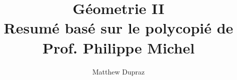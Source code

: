 \documentclass[french]{article}
\theoremstyle{plain}
\theoremstyle{remark}
\theoremstyle{definition}
\begin{document}
\title{Géometrie II \\
	\large Resumé basé sur le polycopié de Prof. Philippe Michel}
\author{Matthew Dupraz}

\maketitle

\newpage

\tableofcontents

\newpage



\end{document}
